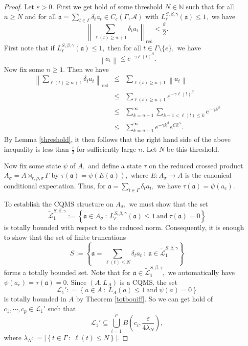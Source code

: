 \documentclass[a4paper,11pt,reqno]{amsart}
\theoremstyle{plain}
\theoremstyle{mainthmstyle}
\theoremstyle{named}
\numberwithin{equation}{section}
\newcommand{\Bea}{\begin{eqnarray*}}
\newcommand{\Eea}{\end{eqnarray*}}
\begin{document}
\begin{proof} Let $\varepsilon > 0.$ First we get hold of some threshold $N \in \mathbb N$ such that for all $n \geq N$ and for all $\mathfrak{a} = \sum\limits_{t \in \Gamma} \delta_t a_t \in C_c (\Gamma, \mathcal A)$ with $L_{\ell}^{S, \beta, \gamma} (\mathfrak{a}) \leq 1,$ we have 
$$\left \|\sum\limits_{\ell (t) \geq n + 1} \delta_t a_t \right \|_{\mathrm {red}} < \frac {\varepsilon} {2}.$$
First note that if $L_{\ell}^{S, \beta, \gamma} (\mathfrak{a}) \leq 1,$ then for all $t \in \Gamma \setminus \{e\},$ we have 
$$\left \|a_t \right \| \leq e^{- \gamma \ell (t)^{\beta}}.$$
Now fix some $n \geq 1.$ Then we have
\Bea
\left \|\sum\limits_{\ell (t) \geq n + 1} \delta_t a_t \right \|_{\mathrm {red}} & \leq & \sum\limits_{\ell (t) \geq n + 1} \left \|a_t \right \| \\ 
& \leq & \sum\limits_{\ell (t) \geq n + 1} e^{- \gamma \ell (t)^{\beta}} \\ 
& \leq & \sum\limits_{k = n + 1}^{\infty} \sum\limits_{k - 1 < \ell (t) \leq k} e^{- \gamma k^{\beta}} \\ 
& \leq & \sum\limits_{k = n + 1}^{\infty} e^{- \gamma k^{\beta}} e^{C k^{\alpha}}.
\Eea
By Lemma \ref{threshold}, it then follows that the right hand side of the above inequality is less than $\frac {\varepsilon} {2}$ for sufficiently large $n.$ Let $N$ be this threshold.

\vspace{2mm}

Now fix some state $\psi$ of $A,$ and define a state $\tau$ on the reduced crossed product $A_{\sigma} = A \rtimes_{r, \rho, \sigma} \Gamma$ by $\tau(\mathfrak{a}) = \psi(E(\mathfrak{a})),$ where $E : A_{\sigma} \rightarrow A$ is the canonical conditional expectation. Thus, for $\mathfrak{a} = \sum\limits_{t \in \Gamma} \delta_t a_t,$ we have $\tau(\mathfrak{a}) = \psi (a_e).$

To establish the CQMS structure on $A_{\sigma},$ we must show that the set 
$$\widetilde{\mathcal{L}}_1^{S, \beta, \gamma} := \left \{\mathfrak{a} \in A_{\sigma}\ :\ L_{\ell}^{S, \beta, \gamma} (\mathfrak{a}) \leq 1 \ \mathrm{and}\ \tau(\mathfrak{a}) = 0 \right \}$$ 
is totally bounded with respect to the reduced norm. Consequently, it is enough to show that the set of finite truncations 
$$S := \left \{\mathfrak{a}=\sum\limits_{\ell (t) \leq N} \delta_t a_t\ :\ \mathfrak{a} \in \widetilde{\mathcal{L}}_1^{S, \beta, \gamma} \right \}$$ 
forms a totally bounded set. Note that for $\mathfrak{a} \in \widetilde{\mathcal{L}}_1^{S, \beta, \gamma},$ we automatically have $\psi(a_e) = \tau(\mathfrak{a}) = 0.$
Since $(A, L_A)$ is a CQMS, the set
$$\mathcal L_1' : = \left \{a \in A\ :\ L_A (a) \leq 1\ \mathrm {and}\ \psi (a) = 0 \right \}$$ 
is totally bounded in $A$ by Theorem \ref{totbouiff}. So we can get hold of $c_1, \cdots, c_p \in \mathcal L_1'$ such that 
$$\mathcal L_1' \subseteq \bigcup\limits_{i = 1}^{p} B \left (c_i, \frac {\varepsilon} {4 \lambda_N} \right ),$$ 
where $\lambda_N : = \left \lvert \left \{t \in \Gamma\ :\ \ell (t) \leq N \right \} \right \rvert.$


\end{proof}
\end{document}
